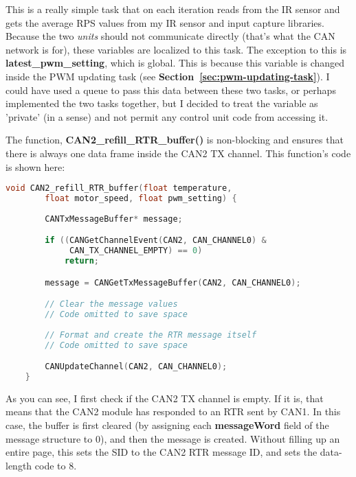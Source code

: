 \documentclass[a4paper, 12pt]{article}
\begin{document}
This is a really simple task that on each iteration reads from the IR sensor and gets the average RPS values from my IR sensor and input capture libraries. Because the two \textit{units} should not communicate directly (that's what the CAN network is for), these variables are localized to this task. The exception to this is \textbf{latest\_pwm\_setting}, which is global. This is because this variable is changed inside the PWM updating task (see \textbf{Section~\ref{sec:pwm-updating-task}}). I could have used a queue to pass this data between these two tasks, or perhaps implemented the two tasks together, but I decided to treat the variable as 'private' (in a sense) and not permit any control unit code from accessing it.

The function, \textbf{CAN2\_refill\_RTR\_buffer()} is non-blocking and ensures that there is always one data frame inside the CAN2 TX channel. This function's code is shown here:

	\begin{mdframed}[backgroundcolor=code-gray, roundcorner=10pt,
								innerleftmargin=5, innertopmargin=5, innerbottommargin=5]	
	\begin{lstlisting}[language=C, caption=Refill CAN2 RTR Buffer Function, tabsize=2, label={lst:can2-refill-rtr-buffer}]
	void CAN2_refill_RTR_buffer(float temperature,
		float motor_speed, float pwm_setting) {
		
		CANTxMessageBuffer* message;

		if ((CANGetChannelEvent(CAN2, CAN_CHANNEL0) &
			 CAN_TX_CHANNEL_EMPTY) == 0)
			return;

		message = CANGetTxMessageBuffer(CAN2, CAN_CHANNEL0);

		// Clear the message values
		// Code omitted to save space
		
		// Format and create the RTR message itself
		// Code omitted to save space

		CANUpdateChannel(CAN2, CAN_CHANNEL0);
	}
	\end{lstlisting}
	\end{mdframed}
	
As you can see, I first check if the CAN2 TX channel is empty. If it is, that means that the CAN2 module has responded to an RTR  sent by CAN1. In this case, the buffer is first cleared (by assigning each \textbf{messageWord} field of the message structure to 0), and then the message is created. Without filling up an entire page, this sets the SID to the CAN2 RTR message ID, and sets the data-length code to 8.
\end{document}
